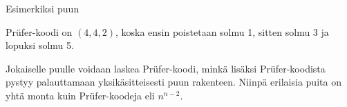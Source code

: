 Esimerkiksi puun

\begin{center}
\end{center}
Prüfer-koodi on $(4,4,2)$,
koska ensin poistetaan solmu 1,
sitten solmu 3 ja lopuksi solmu 5.

Jokaiselle puulle voidaan laskea
Prüfer-koodi, minkä lisäksi
Prüfer-koodista pystyy palauttamaan
yksikäsitteisesti puun rakenteen.
Niinpä erilaisia puita on yhtä monta
kuin Prüfer-koodeja eli $n^{n-2}$.


